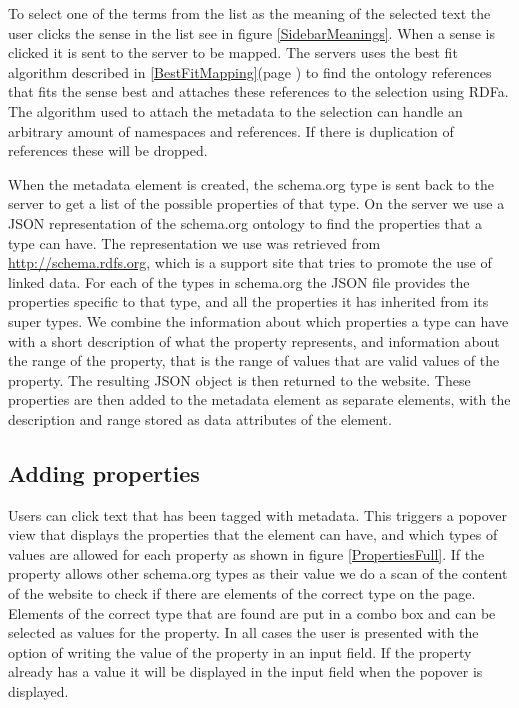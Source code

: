 To select one of the terms from the list as the meaning of the selected text the user clicks the sense in the list see in
figure \ref{SidebarMeanings}.
When a sense is clicked it is sent to the server to be mapped.
The servers uses the best fit algorithm described in \ref{BestFitMapping}(page \pageref{BestFitMapping}) to find the ontology references
that fits the sense best and attaches these references to the selection using RDFa.
The algorithm used to attach the metadata to the selection can handle an arbitrary amount of namespaces and references.
If there is duplication of references these will be dropped.

When the metadata element is created,
the schema.org type is sent back to the server to get a list of the possible properties of that type.
On the server we use a JSON representation of the schema.org ontology to find the properties that a type can have.
The representation we use was retrieved from \url{http://schema.rdfs.org}, which is a support site that tries to
promote the use of linked data.
For each of the types in schema.org the JSON file provides the properties specific to that type,
and all the properties it has inherited from its super types.
We combine the information about which properties a type can have with a short description of what the property represents,
and information about the range of the property, that is the range of values that are valid values of the property.
The resulting JSON object is then returned to the website.
These properties are then added to the metadata element as separate elements,
with the description and range stored as data attributes of the element.

\subsection{Adding properties}

Users can click text that has been tagged with metadata.
This triggers a popover view that displays the properties that the element can have,
and which types of values are allowed for each property as shown in figure \ref{PropertiesFull}.
If the property allows other schema.org types as their value we do a scan of the content of the website to check if
there are elements of the correct type on the page.
Elements of the correct type that are found are put in a combo box and can be selected as values for the property.
In all cases the user is presented with the option of writing the value of the property in an input field.
If the property already has a value it will be displayed in the input field when the popover is displayed.

